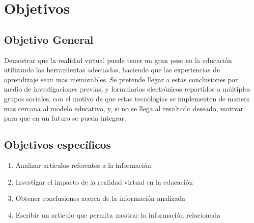 \section{Objetivos}

\subsection{Objetivo General}
Demostrar que la realidad virtual puede tener un gran peso en la educación utilizando las herramientas adecuadas, haciendo que las experiencias de aprendizaje sean mas memorables. Se pretende llegar a estas conclusiones por medio de investigaciones previas, y formularios electrónicos repartidos a múltiples grupos sociales, con el motivo de que estas tecnologías se implementen de manera mas cercana al modelo educativo, y, si no se llega al resultado deseado, motivar para que en un futuro se pueda integrar.

\subsection{Objetivos específicos}
\begin{enumerate}
   \item Analizar artículos referentes a la información
   \item Investigar  el impacto de la realidad virtual en la educación
   \item Obtener conclusiones acerca de la información analizada
   \item Escribir un articulo que permita mostrar la información relacionada
   \end{enumerate}

